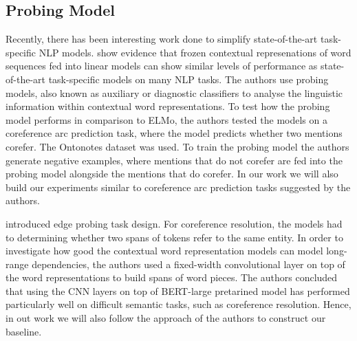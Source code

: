 \documentclass[11pt]{article}
\begin{document}
\subsection{Probing Model}



Recently, there has been interesting work done to simplify state-of-the-art task-specific NLP models. 
 \textcite{liu2019linguistic} show evidence that frozen contextual represenations of word sequences fed into linear models can show similar levels of performance as state-of-the-art task-specific models on many NLP tasks.
The authors use probing models, also known as auxiliary or diagnostic classifiers \parencite{shi2016string, kadar2017representation} to analyse the linguistic information within contextual word representations. To test how the probing model performs in comparison to ELMo, the authors tested the models on a coreference arc prediction task, where the model predicts whether two mentions corefer. The Ontonotes dataset was used. To train the probing model the authors generate negative examples, where mentions that do not corefer are fed into the probing model alongside the mentions that do corefer. In our work we will also build our experiments similar to coreference arc prediction tasks suggested by the authors.

\textcite{tenney2019context} introduced edge probing task design. For coreference resolution, the models had to determining whether two spans of tokens refer to the same entity. In order to investigate how good the contextual word representation models can model long-range dependencies, the authors used a fixed-width convolutional layer on top of the word representations to build spans of word pieces. The authors concluded that using the CNN layers on top of BERT-large pretarined model has performed particularly well on difficult semantic tasks, such as coreference resolution. Hence, in out work we will also follow the approach of the authors to construct our baseline. 
\end{document}
